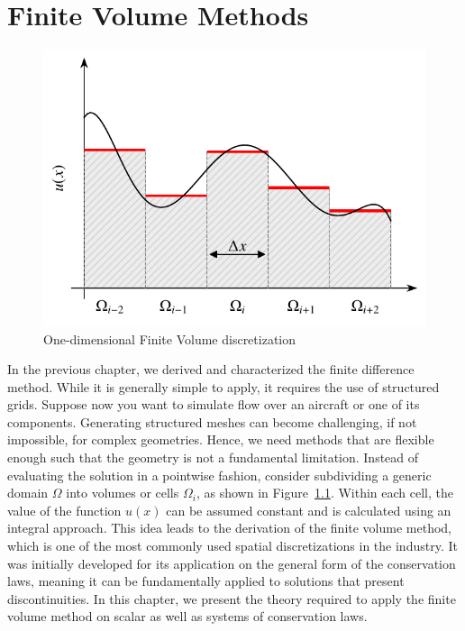\chapter{Finite Volume Methods}
\begin{figure}[htbp]
 \centering
 \includegraphics[width=0.6\linewidth]{Pictures/ch11_fv_scheme}
 \caption{One-dimensional Finite Volume discretization}
 \label{fig:fv_scheme}
\end{figure}
In the previous chapter, we derived and characterized the finite difference method. While it is generally simple to apply, it requires the use of structured grids. Suppose now you want to simulate flow over an aircraft or one of its components. Generating structured meshes can become challenging, if not impossible, for complex geometries. Hence, we need methods that are flexible enough such that the geometry is not a fundamental limitation. Instead of evaluating the solution in a pointwise fashion, consider subdividing a generic domain $\Omega$ into volumes or cells $\Omega_i$, as shown in Figure~\ref{fig:fv_scheme}. Within each cell, the value of the function $u(x)$ can be assumed constant and is calculated using an integral approach. This idea leads to the derivation of the finite volume method, which is one of the most commonly used spatial discretizations in the industry. It was initially developed for its application on the general form of the conservation laws, meaning it can be fundamentally applied to solutions that present discontinuities. In this chapter, we present the theory required to apply the finite volume method on scalar as well as systems of conservation laws.

